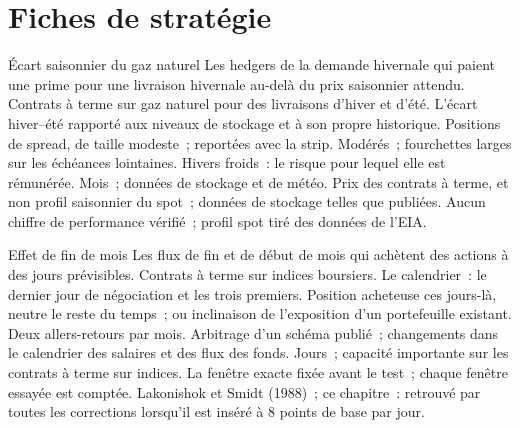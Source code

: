 \section{Fiches de stratégie}

\begin{strategyfile}{Écart saisonnier du gaz naturel}\label{strat:s1:seasonality-and-calendar-effects:gas}
 Les hedgers de la demande hivernale qui paient une prime pour une livraison hivernale au-delà du prix saisonnier attendu.
 Contrats à terme sur gaz naturel pour des livraisons d'hiver et d'été.
 L'écart hiver--été rapporté aux niveaux de stockage et à son propre historique.
 Positions de spread, de taille modeste~; reportées avec la strip.
 Modérés~; fourchettes larges sur les échéances lointaines.
 Hivers froids~: le risque pour lequel elle est rémunérée.
 Mois~; données de stockage et de météo.
 Prix des contrats à terme, et non profil saisonnier du spot~; données de stockage telles que publiées.
 Aucun chiffre de performance vérifié~; profil spot tiré des données de l'EIA.
\end{strategyfile}

\begin{strategyfile}{Effet de fin de mois}\label{strat:s1:seasonality-and-calendar-effects:tom}
 Les flux de fin et de début de mois qui achètent des actions à des jours prévisibles.
 Contrats à terme sur indices boursiers.
 Le calendrier~: le dernier jour de négociation et les trois premiers.
 Position acheteuse ces jours-là, neutre le reste du temps~; ou inclinaison de l'exposition d'un portefeuille existant.
 Deux allers-retours par mois.
 Arbitrage d'un schéma publié~; changements dans le calendrier des salaires et des flux des fonds.
 Jours~; capacité importante sur les contrats à terme sur indices.
 La fenêtre exacte fixée avant le test~; chaque fenêtre essayée est comptée.
 Lakonishok et Smidt (1988)~; ce chapitre~: retrouvé par toutes les corrections lorsqu'il est inséré à 8 points de base par jour.
\end{strategyfile}


